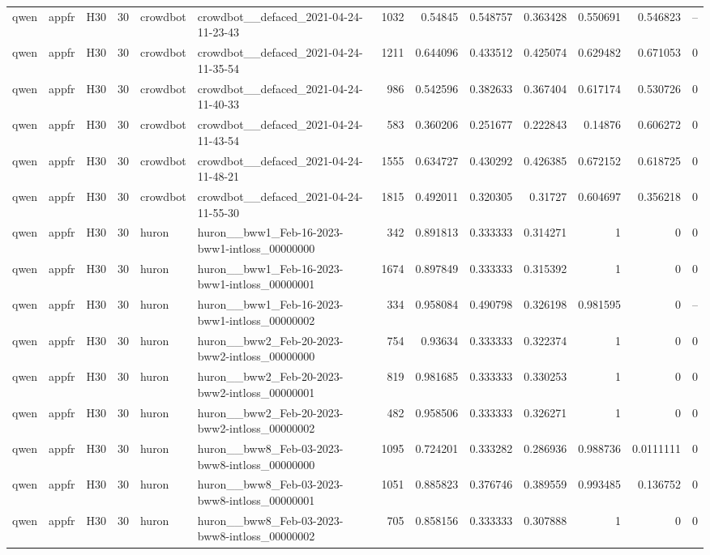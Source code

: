 \begin{longtable}{lllrllrrrrrrr}
qwen & appfr & H30 & 30 & crowdbot & crowdbot\_\_defaced\_2021-04-24-11-23-43 & 1032 & 0.54845 & 0.548757 & 0.363428 & 0.550691 & 0.546823 & -- \\
qwen & appfr & H30 & 30 & crowdbot & crowdbot\_\_defaced\_2021-04-24-11-35-54 & 1211 & 0.644096 & 0.433512 & 0.425074 & 0.629482 & 0.671053 & 0 \\
qwen & appfr & H30 & 30 & crowdbot & crowdbot\_\_defaced\_2021-04-24-11-40-33 & 986 & 0.542596 & 0.382633 & 0.367404 & 0.617174 & 0.530726 & 0 \\
qwen & appfr & H30 & 30 & crowdbot & crowdbot\_\_defaced\_2021-04-24-11-43-54 & 583 & 0.360206 & 0.251677 & 0.222843 & 0.14876 & 0.606272 & 0 \\
qwen & appfr & H30 & 30 & crowdbot & crowdbot\_\_defaced\_2021-04-24-11-48-21 & 1555 & 0.634727 & 0.430292 & 0.426385 & 0.672152 & 0.618725 & 0 \\
qwen & appfr & H30 & 30 & crowdbot & crowdbot\_\_defaced\_2021-04-24-11-55-30 & 1815 & 0.492011 & 0.320305 & 0.31727 & 0.604697 & 0.356218 & 0 \\
qwen & appfr & H30 & 30 & huron & huron\_\_bww1\_Feb-16-2023-bww1-intloss\_00000000 & 342 & 0.891813 & 0.333333 & 0.314271 & 1 & 0 & 0 \\
qwen & appfr & H30 & 30 & huron & huron\_\_bww1\_Feb-16-2023-bww1-intloss\_00000001 & 1674 & 0.897849 & 0.333333 & 0.315392 & 1 & 0 & 0 \\
qwen & appfr & H30 & 30 & huron & huron\_\_bww1\_Feb-16-2023-bww1-intloss\_00000002 & 334 & 0.958084 & 0.490798 & 0.326198 & 0.981595 & 0 & -- \\
qwen & appfr & H30 & 30 & huron & huron\_\_bww2\_Feb-20-2023-bww2-intloss\_00000000 & 754 & 0.93634 & 0.333333 & 0.322374 & 1 & 0 & 0 \\
qwen & appfr & H30 & 30 & huron & huron\_\_bww2\_Feb-20-2023-bww2-intloss\_00000001 & 819 & 0.981685 & 0.333333 & 0.330253 & 1 & 0 & 0 \\
qwen & appfr & H30 & 30 & huron & huron\_\_bww2\_Feb-20-2023-bww2-intloss\_00000002 & 482 & 0.958506 & 0.333333 & 0.326271 & 1 & 0 & 0 \\
qwen & appfr & H30 & 30 & huron & huron\_\_bww8\_Feb-03-2023-bww8-intloss\_00000000 & 1095 & 0.724201 & 0.333282 & 0.286936 & 0.988736 & 0.0111111 & 0 \\
qwen & appfr & H30 & 30 & huron & huron\_\_bww8\_Feb-03-2023-bww8-intloss\_00000001 & 1051 & 0.885823 & 0.376746 & 0.389559 & 0.993485 & 0.136752 & 0 \\
qwen & appfr & H30 & 30 & huron & huron\_\_bww8\_Feb-03-2023-bww8-intloss\_00000002 & 705 & 0.858156 & 0.333333 & 0.307888 & 1 & 0 & 0 \\

\end{longtable}

